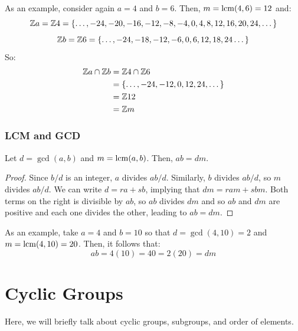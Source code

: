 \documentclass[letterpaper]{article}
\begin{document}
As an example, consider again $a = 4$ and $b = 6$. Then, $m = \operatorname{lcm}(4, 6) = 12$ and: 
\[\mathbb{Z} a = \mathbb{Z} 4 = \{\dots, -24, -20, -16, -12, -8, -4, 0, 4, 8, 12, 16, 20, 24, \dots\}\]
\[\mathbb{Z} b = \mathbb{Z} 6 = \{\dots, -24, -18, -12, -6, 0, 6, 12, 18, 24 \dots\}\]
So: 
\begin{equation*}
    \begin{aligned}
        \mathbb{Z} a \cap \mathbb{Z} b &= \mathbb{Z} 4 \cap \mathbb{Z} 6 \\ 
            &= \{\dots, -24, -12, 0, 12, 24, \dots\} \\ 
            &= \mathbb{Z} 12 \\ 
            &= \mathbb{Z} m
    \end{aligned}
\end{equation*}


\subsubsection{LCM and GCD}

\begin{corollary}{}{}
    Let $d = \gcd(a, b)$ and $m = \operatorname{lcm}(a, b)$. Then, $ab = dm$. 
\end{corollary}

\begin{mdframed}
    \begin{proof}
        Since $b / d$ is an integer, $a$ divides $ab / d$. Similarly, $b$ divides $ab / d$, so $m$ divides $ab / d$. We can write $d  = ra + sb$, implying that $dm = ram + sbm$. Both terms on the right is divisible by $ab$, so $ab$ divides $dm$ and so $ab$ and $dm$ are positive and each one divides the other, leading to $ab = dm$.  
    \end{proof}
\end{mdframed}

As an example, take $a = 4$ and $b = 10$ so that $d = \gcd(4, 10) = 2$ and $m = \operatorname{lcm}(4, 10) = 20$. Then, it follows that: 
\[ab = 4(10) = 40 = 2(20) = dm\]










\newpage 
\section{Cyclic Groups} 
Here, we will briefly talk about cyclic groups, subgroups, and order of elements.
\end{document}
